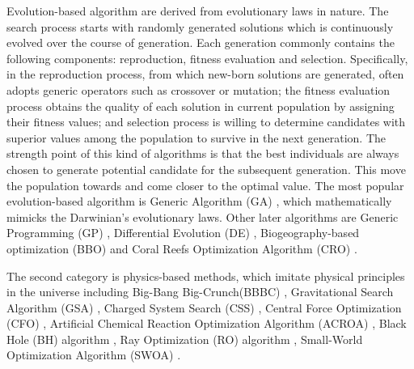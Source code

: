 \documentclass[a4paper,13pt,2p]{report}
\begin{document}
	Evolution-based algorithm are derived from evolutionary laws in nature. The search process starts with randomly generated solutions which is continuously evolved over the course of generation. Each generation commonly contains the following components: reproduction, fitness evaluation and selection. Specifically, in the reproduction process, from which new-born solutions are generated, often adopts generic operators such as crossover or mutation; the fitness evaluation process obtains the quality of each solution in current population by assigning their fitness values; and selection process is willing to determine candidates with superior values among the population to survive in the next generation. The strength point of this kind of algorithms is that the best individuals are always chosen to generate potential candidate for the subsequent generation. This move the population towards and come closer to the optimal value. The most popular evolution-based algorithm is Generic Algorithm (GA) \cite{holland1992genetic}, which mathematically mimicks the Darwinian's evolutionary laws. Other later algorithms are Generic Programming (GP) \cite{koza1997genetic}, Differential Evolution (DE) \cite{fleetwood2004introduction}, Biogeography-based optimization (BBO) \cite{simon2008biogeography} and Coral Reefs Optimization Algorithm (CRO) \cite{salcedo2013novel}. 
	
	The second category is physics-based methods, which imitate physical principles in the universe including Big-Bang Big-Crunch(BBBC) \cite{erol2006new}, Gravitational Search Algorithm (GSA) \cite{rashedi2009gsa}, Charged System Search (CSS) \cite{kaveh2010novel}, Central Force Optimization (CFO) \cite{formato2007central}, Artificial Chemical Reaction Optimization Algorithm (ACROA) \cite{alatas2011acroa}, Black Hole (BH) algorithm \cite{hatamlou2013black}, Ray Optimization (RO) algorithm \cite{kaveh2012new}, Small-World Optimization Algorithm
(SWOA)  \cite{du2006small}.
\end{document}
